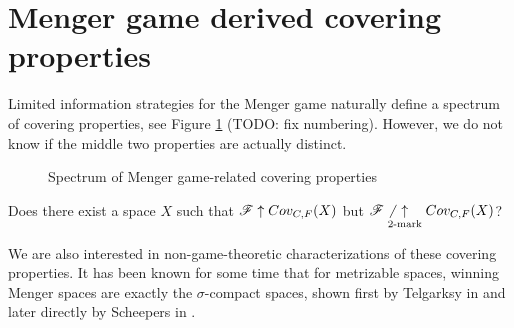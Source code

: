 \section{Menger game derived covering properties}

Limited information strategies for the Menger game naturally define a spectrum
of covering properties, see Figure \ref{menSpec} (TODO: fix numbering). However,
we do not know if the middle two properties are actually distinct.

\begin{figure}[h]\label{menSpec}
\begin{center}
\end{center}
\caption{Spectrum of Menger game-related covering properties}
\end{figure}

\begin{ques}\label{perfectTo2Mark}
  Does there exist a space $X$ such that $\mathscr{F} \uparrow Cov_{C,F}(X)$ but
  $\mathscr{F} \not\underset{2\text{-mark}}{\uparrow} Cov_{C,F}(X)$?
\end{ques}

We are also interested in non-game-theoretic characterizations of these
covering properties. It has been known for some time that for metrizable spaces,
winning Menger spaces are exactly the $\sigma$-compact spaces, shown first
by Telgarksy in \cite{MR753073} and later directly by Scheepers in
\cite{MR1273523}.

